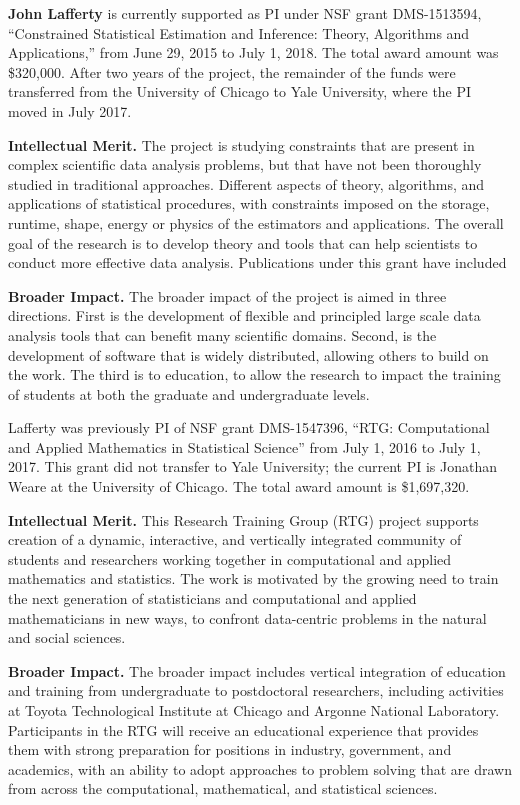 \vskip10pt \textbf{John Lafferty} is currently supported as PI under NSF
grant DMS-1513594, ``Constrained Statistical Estimation and Inference:
Theory, Algorithms and Applications,'' from June 29, 2015 to July 1,
2018. The total award amount was \$320,000. After two years of the
project, the remainder of the funds were transferred from the
University of Chicago to Yale University, where the PI moved in July
2017.

{\bf Intellectual Merit.}  The project is studying constraints that
are present in complex scientific data analysis problems, but that
have not been thoroughly studied in traditional approaches. Different
aspects of theory, algorithms, and applications of statistical
procedures, with constraints imposed on the storage, runtime, shape,
energy or physics of the estimators and applications. The overall goal
of the research is to develop theory and tools that can help
scientists to conduct more effective data analysis. Publications under
this grant have included \citep{ChatterjeeL18,MishraILH18,
abs-1803-01302,MishraLH17,YangB0L16,ChatterjeeDLZ16,ZhengL16,
MishraZLH15,ZhengL15,ZhuL14,Bonak18}


{\bf Broader Impact.} The broader impact of the project is aimed in
three directions. First is the development of flexible and principled
large scale data analysis tools that can benefit many scientific
domains.  Second, is the development of software that is widely
distributed, allowing others to build on the work. The third is to
education, to allow the research to impact the training of students at
both the graduate and undergraduate levels.


\vskip10pt \noindent Lafferty was previously PI of NSF grant
DMS-1547396, ``RTG: Computational and Applied Mathematics in
Statistical Science'' from July 1, 2016 to July 1, 2017. This grant
did not transfer to Yale University; the current PI is Jonathan Weare
at the University of Chicago. The total award amount is \$1,697,320.

{\bf Intellectual Merit.}  This Research Training Group (RTG) project
supports creation of a dynamic, interactive, and vertically integrated
community of students and researchers working together in
computational and applied mathematics and statistics. The work is
motivated by the growing need to train the next generation of
statisticians and computational and applied mathematicians in new
ways, to confront data-centric problems in the natural and social
sciences.

{\bf Broader Impact.} The broader impact includes vertical integration
of education and training from undergraduate to postdoctoral
researchers, including activities at Toyota Technological Institute at
Chicago and Argonne National Laboratory. Participants in the RTG will
receive an educational experience that provides them with strong
preparation for positions in industry, government, and academics, with
an ability to adopt approaches to problem solving that are drawn from
across the computational, mathematical, and statistical sciences.

